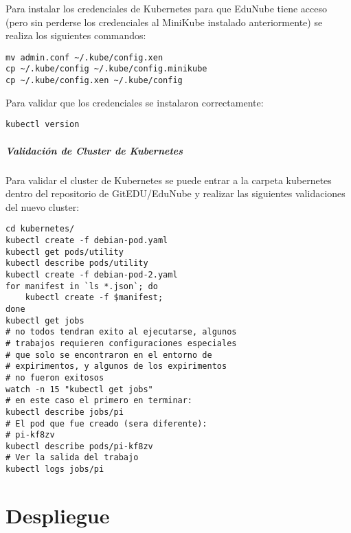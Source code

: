 Para instalar los credenciales de Kubernetes para que EduNube tiene acceso (pero sin perderse los credenciales al MiniKube instalado anteriormente) se realiza los siguientes commandos:
\begin{lstlisting}
mv admin.conf ~/.kube/config.xen
cp ~/.kube/config ~/.kube/config.minikube
cp ~/.kube/config.xen ~/.kube/config
\end{lstlisting}

Para validar que los credenciales se instalaron correctamente:
\begin{lstlisting}
kubectl version
\end{lstlisting}

\subparagraph{Validación de Cluster de Kubernetes}
Para validar el cluster de Kubernetes se puede entrar a la carpeta kubernetes dentro del repositorio de GitEDU/EduNube y realizar las siguientes validaciones del nuevo cluster:
\begin{lstlisting}
cd kubernetes/
kubectl create -f debian-pod.yaml
kubectl get pods/utility
kubectl describe pods/utility
kubectl create -f debian-pod-2.yaml
for manifest in `ls *.json`; do
    kubectl create -f $manifest;
done
kubectl get jobs
# no todos tendran exito al ejecutarse, algunos
# trabajos requieren configuraciones especiales
# que solo se encontraron en el entorno de
# expirimentos, y algunos de los expirimentos
# no fueron exitosos
watch -n 15 "kubectl get jobs"
# en este caso el primero en terminar:
kubectl describe jobs/pi
# El pod que fue creado (sera diferente):
# pi-kf8zv
kubectl describe pods/pi-kf8zv
# Ver la salida del trabajo
kubectl logs jobs/pi
\end{lstlisting}

  

\section{Despliegue}

